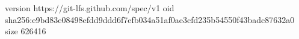 version https://git-lfs.github.com/spec/v1
oid sha256:e9bd83e08498efdd9ddd6f7efb034a51af0ae3cfd235b54550f43badc87632a0
size 626416
